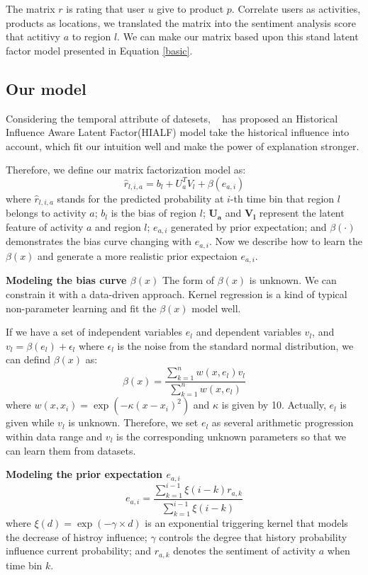 \documentclass[runningheads]{llncs}
\begin{document}
The matrix $r$ is rating that user $u$ give to product $p$.
Correlate users as activities, products as locations, we translated the matrix into the sentiment analysis score that actitivy $a$ to region $l$.
We can make our matrix based upon this stand latent factor model presented in Equation \ref{basic}.

\subsection{Our model}
Considering the temporal attribute of datesets, ~\cite{Zhang2017Model} has proposed an Historical Influence Aware Latent Factor(HIALF) model take the historical influence into account, which fit our intuition well and make the power of explanation stronger.

Therefore, we define our matrix factorization model as:
\begin{equation}
\hat{r}_{l,i,a}=b_l+U_a^TV_l+\beta(e_{a,i})\label{model}
\end{equation}
where $\hat{r}_{l,i,a}$ stands for the predicted probability at $i$-th time bin that region $l$ belongs to activity $a$;
$b_l$ is the bias of region $l$;
$\bm{U_a}$ and $\bm{V_l}$ represent the latent feature of activity $a$ and region $l$;
$e_{a,i}$ generated by prior expectation;
and $\beta(\cdot)$ demonstrates the bias curve changing with $e_{a,i}$.
Now we describe how to learn the $\beta(x)$ and generate a more realistic prior expectaion $e_{a,i}$.

\textbf{Modeling the bias curve $\beta(x)$}
The form of $\beta(x)$ is unknown.
We can constrain it with a data-driven approach.
Kernel regression is a kind of typical non-parameter learning and fit the $\beta(x)$ model well.

If we have a set of independent variables $e_l$ and dependent variables $v_l$, and $v_l=\beta(e_l)+\epsilon_l$ where $\epsilon_l$ is the noise from the standard normal distribution, we can defind $\beta(x)$ as:
$$\beta(x) = \frac{\sum_{k=1}^{n}w(x,e_l)v_l}{\sum_{k=1}^{n}w(x,e_l)}$$
where $w(x, x_i) = \exp(-\kappa(x-x_i)^2)$ and $\kappa$ is given by 10.
Actually, $e_l$ is given while $v_l$ is unknown.
Therefore, we set $e_l$ as several arithmetic progression within data range and $v_l$ is the corresponding unknown parameters so that we can learn them from datasets.

\textbf{Modeling the prior expectation $e_{a,i}$}
$$e_{a,i} = \frac{\sum_{k=1}^{i-1}\xi(i-k) r_{a,k}}{\sum_{k=1}^{i-1}\xi(i-k)}$$
where $\xi(d)=\exp(-\gamma\times d)$ is an exponential triggering kernel that models the decrease of histroy influence;
$\gamma$ controls the degree that history probability influence current probability;
and $r_{a,k}$ denotes the sentiment of activity $a$ when time bin $k$.
\end{document}
